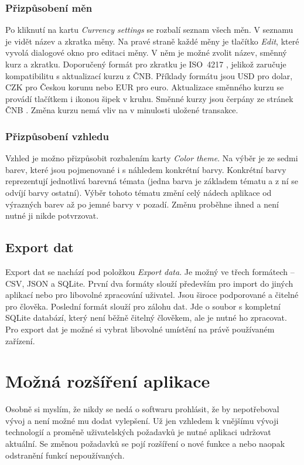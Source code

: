 \documentclass[
  biblatex,
  figures=true,
  tables=false,
  glossaries,
  index
]{kidiplom}
\begin{document}
\subsubsection{Přizpůsobení měn}
Po kliknutí na kartu \textit{Currency settings} se rozbalí seznam všech měn. V seznamu je vidět název a zkratka měny. Na pravé straně každé měny je tlačítko \textit{Edit}, které vyvolá dialogové okno pro editaci měny. V něm je možné zvolit název, směnný kurz a zkratku. Doporučený formát pro zkratku je  ISO~4217 \cite{iso4217}, jelikož zaručuje kompatibilitu s aktualizací kurzu z ČNB. Příklady formátu jsou USD pro dolar, CZK pro Českou korunu nebo EUR pro euro. Aktualizace směnného kurzu se provádí tlačítkem i ikonou šipek v kruhu. Směnné kurzy jsou čerpány ze stránek ČNB \cite{cnb-kurzy}. Změna kurzu nemá vliv na v minulosti uložené transakce.

\subsubsection{Přizpůsobení vzhledu}
Vzhled je možno přizpůsobit rozbalením karty \textit{Color theme}. Na výběr je ze sedmi barev, které jsou pojmenované i s náhledem konkrétní barvy. Konkrétní barvy reprezentují jednotlivá barevná témata (jedna barva je základem tématu a z ní se odvíjí barvy ostatní). Výběr tohoto tématu změní celý nádech aplikace od výrazných barev až po jemné barvy v pozadí. Změnu proběhne ihned a není nutné ji nikde potvrzovat.

\subsection{Export dat}
Export dat se nachází pod položkou \textit{Export data}. Je možný ve třech formátech -- CSV, JSON a SQLite. První dva formáty slouží především pro import do jiných aplikací nebo pro libovolné zpracování uživatel. Jsou široce podporované a čitelné pro člověka. Poslední formát slouží pro zálohu dat. Jde o soubor s kompletní SQLite databází, který není běžně čitelný člověkem, ale je nutné ho zpracovat. Pro export dat je možné si vybrat libovolné umístění na právě používaném zařízení.

\section{Možná rozšíření aplikace}
Osobně si myslím, že nikdy se nedá o softwaru prohlásit, že by nepotřeboval vývoj a není možné mu dodat vylepšení. Už jen vzhledem k vnějšímu vývoji technologií a proměně uživatelských požadavků je nutné aplikaci udržovat aktuální. Se změnou požadavků se pojí rozšíření o nové funkce a nebo naopak odstranění funkcí nepoužívaných.
\end{document}

